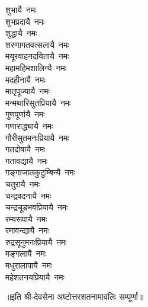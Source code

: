 \begin{flushleft}
\begin{multicols}{2}
शुभायै~नमः\\
शुभप्रदायै~नमः\\
शुद्धायै~नमः\\
शरणागतवत्सलायै~नमः\\
मयूरवाहनदयितायै~नमः\\
महामहिमशालिन्यै~नमः\hfill{}\\
मदहीनायै~नमः\\
मातृपूज्यायै~नमः\\
मन्मथारिसुतप्रियायै~नमः\\
गुणपूर्णायै~नमः\\
गणाराद्ध्यायै~नमः\\
गौरीसुतमनःप्रियायै~नमः\\
गतदोषायै~नमः\\
गतावद्यायै~नमः\\
गङ्गाजातकुटुम्बिन्यै~नमः\\
चतुरायै~नमः\hfill{}\\
चन्द्रवदनायै~नमः\\
चन्द्रचूडभवप्रियायै~नमः\\
रम्यरूपायै~नमः\\
रमावन्द्यायै~नमः\\
रुद्रसूनुमनःप्रियायै~नमः\\
मङ्गलायै~नमः\\
मधुरालापायै~नमः\\
महेशतनयप्रियायै~नमः\\
\end{multicols}
\end{flushleft}
॥इति श्री-देवसेना अष्टोत्तरशतनामावलिः सम्पूर्णा॥

